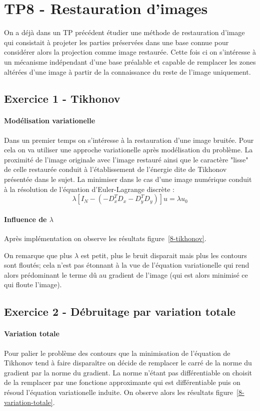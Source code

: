 \section{TP8 - Restauration d'images}
On a déjà dans un TP précédent étudier une méthode de restauration d'image qui consistait à projeter les parties préservées dans une base connue pour considérer alors la projection comme image restaurée. Cette fois ci on s'intéresse à un mécanisme indépendant d'une base préalable et capable de remplacer les zones altérées d'une image à partir de la connaissance du reste de l'image uniquement.

\subsection{Exercice 1 - Tikhonov}
\paragraph{Modélisation variationelle}
Dans un premier temps on s'intéresse à la restauration d'une image bruitée. Pour cela on va utiliser une approche variationelle après modélisation du problème. La proximité de l'image originale avec l'image restauré ainsi que le caractère "lisse" de celle restaurée conduit à l'établissement de l'énergie dite de Tikhonov présentée dans le sujet. La minimiser dans le cas d'une image numérique conduit à la résolution de l'équation d'Euler-Lagrange discrète :
\[\lambda [I_N - (-D_x^TD_x - D_y^TD_y)]u = \lambda u_0\]

\paragraph{Influence de $\lambda$}
Après implémentation on observe les résultats figure~\ref{8-tikhonov}.

\begin{figure}
\end{figure}

On remarque que plus $\lambda$ est petit, plus le bruit disparait mais plus les contours sont floutés; cela n'est pas étonnant à la vue de l'équation variationelle qui rend alors prédominant le terme dû au gradient de l'image (qui est alors minimisé ce qui floute l'image).

\subsection{Exercice 2 - Débruitage par variation totale}
\paragraph{Variation totale}
Pour palier le problème des contours que la minimisation de l'équation de Tikhonov tend à faire disparaître on décide de remplacer le carré de la norme du gradient par la norme du gradient. La norme n'étant pas différentiable on choisit de la remplacer par une fonctione approximante qui est différentiable puis on résoud l'équation variationelle induite. On observe alors les résultats figure~\ref{8-variation-totale}.


